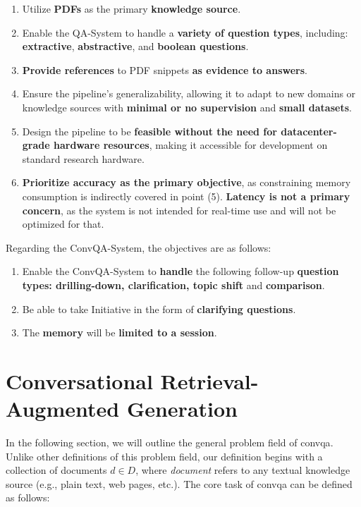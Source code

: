 \begin{enumerate}
    \item Utilize \textbf{PDFs} as the primary \textbf{knowledge source}.
    \item Enable the QA-System to handle a \textbf{variety of question types}, including: \textbf{extractive}, \textbf{abstractive}, and \textbf{boolean questions}.
    \item \textbf{Provide references} to PDF snippets \textbf{as evidence to answers}.
    \item Ensure the pipeline's generalizability, allowing it to adapt to new domains or knowledge sources with \textbf{minimal or no supervision} and \textbf{small datasets}.
    \item Design the pipeline to be \textbf{feasible without the need for datacenter-grade hardware resources}, making it accessible for development on standard research hardware.
    \item \textbf{Prioritize accuracy as the primary objective}, as constraining memory consumption is indirectly covered in point (5). \textbf{Latency is not a primary concern}, as the system is not intended for real-time use and will not be optimized for that.
\end{enumerate}


Regarding the ConvQA-System, the objectives are as follows:

\begin{enumerate}
    \item Enable the ConvQA-System to \textbf{handle} the following follow-up \textbf{question types: drilling-down, clarification, topic shift} and \textbf{comparison}.
    \item Be able to take Initiative in the form of \textbf{clarifying questions}.
    \item The \textbf{memory} will be \textbf{limited to a session}.
\end{enumerate}

\section{Conversational Retrieval-Augmented Generation}
\label{sec:conrag}

In the following section, we will outline the general problem field of \gls{convqa}. Unlike other definitions of this problem field, our definition begins with a collection of documents $d \in D$, where \textit{document} refers to any textual knowledge source (e.g., plain text, web pages, etc.). The core task of \gls{convqa} can be defined as follows:

